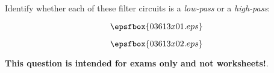 

Identify whether each of these filter circuits is a {\it low-pass} or a {\it high-pass}:

\vskip 10pt

$$\epsfbox{03613x01.eps}$$







$$\epsfbox{03613x02.eps}$$







{\bf This question is intended for exams only and not worksheets!}.



